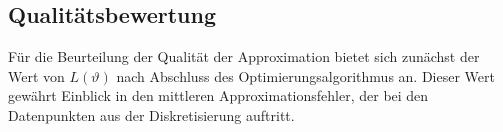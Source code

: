 %
%
%

\subsection{Qualitätsbewertung}\label{neuronal:subsection:qualitätsbewertung}
Für die Beurteilung der Qualität der Approximation bietet sich zunächst der Wert von \( L(\vartheta) \) nach Abschluss des Optimierungsalgorithmus an.
Dieser Wert gewährt Einblick in den mittleren Approximationsfehler, der bei den Datenpunkten aus der Diskretisierung auftritt.

